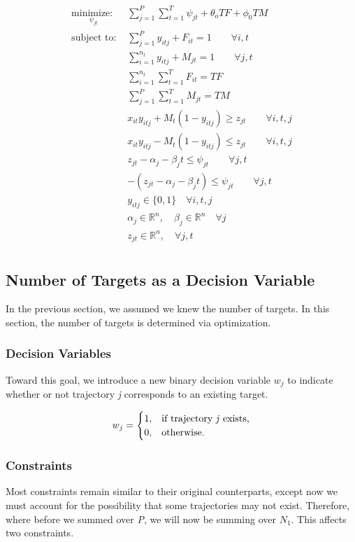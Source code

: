 \documentclass[journal]{IEEEtran}
\begin{document}
\begin{align*}
\underset{\psi_{jt}}{\text{minimize: }} & \sum_{j=1}^{P} \sum_{t=1}^{T} \psi_{jt} + \theta_{o} TF + \phi_{0} TM\\
\text{subject to: }	& \sum_{j=1}^{P} y_{itj} + F_{it} = 1 \qquad \forall i,t\\
				& \sum_{i=1}^{n_{t}} y_{itj} + M_{jt} = 1 \qquad \forall j,t\\
				& \sum_{i=1}^{n_{t}} \sum_{t=1}^{T} F_{it} = TF\\
				& \sum_{j=1}^{P} \sum_{t=1}^{T} M_{jt} = TM\\
				& x_{it}y_{itj} + M_{t}(1-y_{itj}) \geq z_{jt} \qquad \forall i,t,j\\
				& x_{it}y_{itj} - M_{t}(1-y_{itj}) \leq z_{jt} \qquad \forall i,t,j\\
				& z_{jt} - \alpha_{j} - \beta_{j}t \leq \psi_{jt} \qquad \forall j,t\\
				& -(z_{jt} - \alpha_{j} - \beta_{j}t) \leq \psi_{jt} \qquad \forall j,t\\
				& y_{itj} \in \{0,1\} \quad \forall i,t,j\\
				& \alpha_{j} \in \mathbb{R}^n,\quad \beta_{j} \in \mathbb{R}^n \quad \forall j\\
				& z_{jt} \in \mathbb{R}^n, \quad \forall j,t\\
\end{align*}

\subsection{Number of Targets as a Decision Variable}
In the previous section, we assumed we knew the number of targets. In this section, the number of targets is determined via optimization. 

\subsubsection{Decision Variables}
Toward this goal, we introduce a new binary decision variable $w_{j}$ to indicate whether or not trajectory \textit{j} corresponds to an existing target.

\[w_{j} = 
\begin{cases}
1, & \text{if trajectory \textit{j} exists,}\\
0, & \text{otherwise.}
\end{cases}\]


\subsubsection{Constraints}
Most constraints remain similar to their original counterparts, except now we must account for the possibility that some trajectories may not exist. Therefore, where before we summed over \textit{P}, we will now be summing over $N_{1}$. This affects two constraints.
\end{document}
